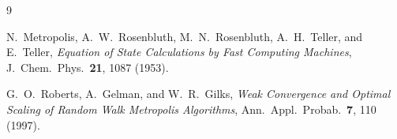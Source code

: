 \documentclass[11pt, letterpaper]{article}
\begin{document}
\begin{thebibliography}{9}

  N.~Metropolis, A.~W.~Rosenbluth, M.~N.~Rosenbluth, A.~H.~Teller, and E.~Teller,
  \textit{Equation of State Calculations by Fast Computing Machines},
  J.\ Chem.\ Phys.\ \textbf{21}, 1087 (1953).

  G.~O.~Roberts, A.~Gelman, and W.~R.~Gilks,
  \textit{Weak Convergence and Optimal Scaling of Random Walk Metropolis Algorithms},
  Ann.\ Appl.\ Probab.\ \textbf{7}, 110 (1997).

\end{thebibliography}
\end{document}
